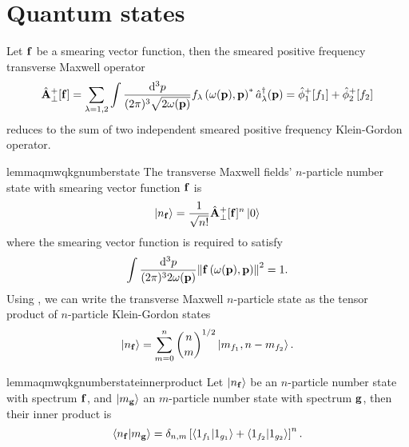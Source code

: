 \section{Quantum states}

\begin{corollary}\label{thm:qmw_qkg}
	Let $\vb{f}$ be a smearing vector function, then the smeared positive frequency transverse Maxwell operator
	\begin{equation}
		\hat{\vb{A}}_\perp^+[\vb{f}]
		=
		\sum_{\lambda=1,2}
		\int\frac{\dd[3]{p}}{(2\pi)^3\sqrt{2\omega(\vb{p})}}
		f_\lambda\left(\omega(\vb{p}),\vb{p}\right)^*
		\hat{a}_\lambda^\dagger(\vb{p})
		=
		\hat\phi_1^+[f_1]
		+
		\hat\phi_2^+[f_2]
	\end{equation}
	 reduces to the sum of two independent smeared positive frequency Klein-Gordon operator.
\end{corollary}
\begin{restatable}{lemma}{qmwqkgnumberstate}\label{thm:qmw_qkg_number_state}
	The transverse Maxwell fields' $n$-particle number state with smearing vector function $\vb{f}$ is
	\begin{equation}
		\label{eq:qmw_number_state}
		\ket{n_{\vb{f}}}
		=
		\frac{1}{\sqrt{n!}}
		\hat{\vb{A}}_\perp^+[\vb{f}]^n
		\ket{0}
	\end{equation}
	where the smearing vector function is required to satisfy
	\begin{equation}
		\int\frac{\dd[3]{p}}{(2\pi)^32\omega(\vb{p})}
		\norm{\vb{f}\left(\omega(\vb{p}),\vb{p}\right)}^2
		=
		1
		.
	\end{equation}
	Using , we can write the transverse Maxwell $n$-particle state as the tensor product of $n$-particle Klein-Gordon states
	\begin{equation}
		\ket{n_{\vb{f}}}
		=
		\sum^n_{m=0}
		\binom{n}{m}^{1/2}
		\ket{m_{f_1},n-m_{f_2}}
		.
	\end{equation}
\end{restatable}
\begin{restatable}{lemma}{qmwqkgnumberstateinnerproduct}\label{thm:qmw_qkg_number_state_inner_product}
	Let $\ket{n_{\vb{f}}}$ be an $n$-particle number state with spectrum $\vb{f}$, and $\ket{m_{\vb{g}}}$ an $m$-particle number state with spectrum $\vb{g}$, then their inner product is
	\begin{equation}
		\braket{n_{\vb{f}}}{m_{\vb{g}}}
		=
		\delta_{n,m}
		\left[
			\braket{1_{f_1}}{1_{g_1}}
			+
			\braket{1_{f_2}}{1_{g_2}}
		\right]^n
		.
	\end{equation}
\end{restatable}

